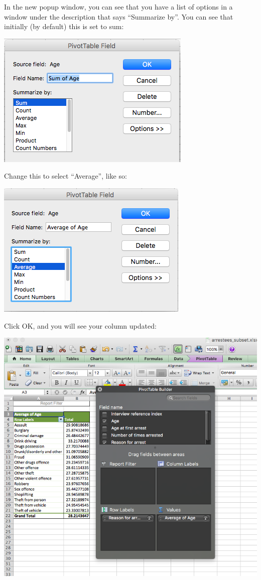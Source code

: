 \documentclass[]{book}
\theoremstyle{definition}
\theoremstyle{definition}
\theoremstyle{definition}
\theoremstyle{remark}
\begin{document}
In the new popup window, you can see that you have a list of options in
a window under the description that says ``Summarize by''. You can see
that initially (by default) this is set to sum:

\includegraphics{imgs/set_to_sum.png}

Change this to select ``Average'', like so:

\includegraphics{imgs/set_to_avg.png}

Click OK, and you will see your column updated:

\includegraphics{imgs/is_now_avg_col.png}
\end{document}
